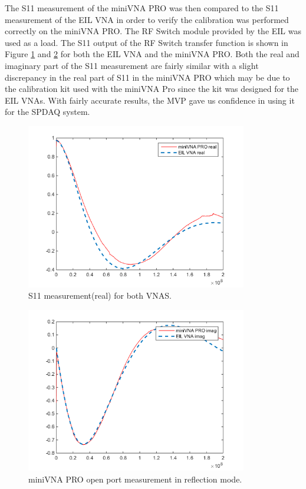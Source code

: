 The S11 measurement of the miniVNA PRO was then compared to the S11 measurement of the EIL VNA in order to verify the calibration was performed correctly on the miniVNA PRO. The RF Switch module provided by the EIL was used as a load. The S11 output of the RF Switch transfer function is shown in Figure \ref{fig:real} and \ref{fig:imag} for both the EIL VNA and the miniVNA PRO. Both the real and imaginary part of the S11 measurement are fairly similar with a slight discrepancy in the real part of S11 in the miniVNA PRO which may be due to the calibration kit used with the miniVNA Pro since the kit was designed for the EIL VNAs. 
With fairly accurate results, the MVP gave us confidence in using it for the SPDAQ system. 

\begin{figure}[!ht]
\begin{center}
\includegraphics[width=3.8in]{./images/real.png}
\caption{S11 measurement(real) for both VNAS.}
\label{fig:real}
\end{center}
\end{figure}

\begin{figure}[!ht]
\begin{center}
\includegraphics[width=3.8in]{./images/imag.png}
\caption{miniVNA PRO open port measurement in reflection mode.}
\label{fig:imag}
\end{center}
\end{figure}

